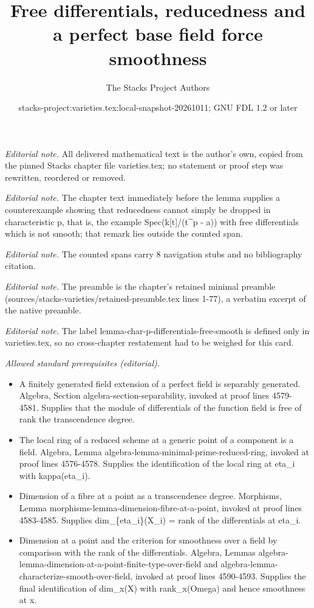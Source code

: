 \documentclass[10pt,a4paper]{amsart}
\title{Free differentials, reducedness and a perfect base field force smoothness}
\author{The Stacks Project Authors}
\date{stacks-project:varieties.tex:local-snapshot-20261011; GNU FDL 1.2 or later}
\theoremstyle{plain}
\theoremstyle{definition}
\theoremstyle{remark}
\numberwithin{equation}{subsection}
\begin{document}
\maketitle
\noindent\textit{Editorial note.} All delivered mathematical text is the author's own, copied from the pinned Stacks chapter file varieties.tex; no statement or proof step was rewritten, reordered or removed.\par\medskip
\noindent\textit{Editorial note.} The chapter text immediately before the lemma supplies a counterexample showing that reducedness cannot simply be dropped in characteristic p, that is, the example Spec(k[t]/(t\textasciicircum{}p - a)) with free differentials which is not smooth; that remark lies outside the counted span.\par\medskip
\noindent\textit{Editorial note.} The counted spans carry 8 navigation stubs and no bibliography citation.\par\medskip
\noindent\textit{Editorial note.} The preamble is the chapter's retained minimal preamble (sources/stacks-varieties/retained-preamble.tex lines 1-77), a verbatim excerpt of the native preamble.\par\medskip
\noindent\textit{Editorial note.} The label lemma-char-p-differentials-free-smooth is defined only in varieties.tex, so no cross-chapter restatement had to be weighed for this card.\par\medskip
\noindent\textit{Allowed standard prerequisites (editorial).}\begin{itemize}
\item A finitely generated field extension of a perfect field is separably generated. Algebra, Section algebra-section-separability, invoked at proof lines 4579-4581. Supplies that the module of differentials of the function field is free of rank the transcendence degree.
\item The local ring of a reduced scheme at a generic point of a component is a field. Algebra, Lemma algebra-lemma-minimal-prime-reduced-ring, invoked at proof lines 4576-4578. Supplies the identification of the local ring at eta\_i with kappa(eta\_i).
\item Dimension of a fibre at a point as a transcendence degree. Morphisms, Lemma morphisms-lemma-dimension-fibre-at-a-point, invoked at proof lines 4583-4585. Supplies dim\_\{eta\_i\}(X\_i) = rank of the differentials at eta\_i.
\item Dimension at a point and the criterion for smoothness over a field by comparison with the rank of the differentials. Algebra, Lemmas algebra-lemma-dimension-at-a-point-finite-type-over-field and algebra-lemma-characterize-smooth-over-field, invoked at proof lines 4590-4593. Supplies the final identification of dim\_x(X) with rank\_x(Omega) and hence smoothness at x.
\end{itemize}\medskip
\end{document}
